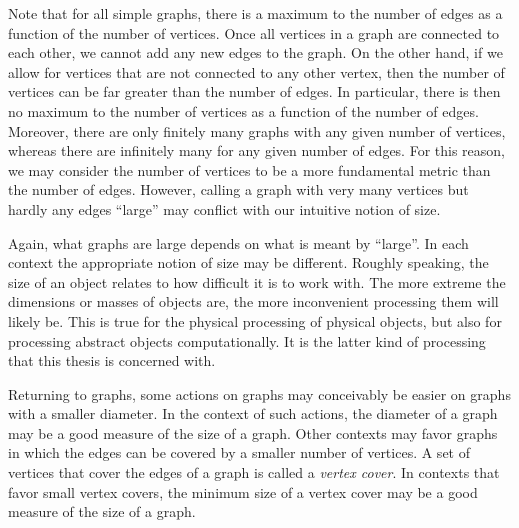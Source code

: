 Note that for all simple graphs, there is a maximum to the number of edges as a function of the number of vertices.
Once all vertices in a graph are connected to each other, we cannot add any new edges to the graph.
On the other hand, if we allow for vertices that are not connected to any other vertex, then the number of vertices can be far greater than the number of edges.
In particular, there is then no maximum to the number of vertices as a function of the number of edges.
Moreover, there are only finitely many graphs with any given number of vertices, whereas there are infinitely many for any given number of edges.
For this reason, we may consider the number of vertices to be a more fundamental metric than the number of edges.
However, calling a graph with very many vertices but hardly any edges \enquote{large} may conflict with our intuitive notion of size.

Again, what graphs are large depends on what is meant by \enquote{large}.
In each context the appropriate notion of size may be different.
Roughly speaking, the size of an object relates to how difficult it is to work with.
The more extreme the dimensions or masses of objects are, the more inconvenient processing them will likely be.
This is true for the physical processing of physical objects, but also for processing abstract objects computationally.
It is the latter kind of processing that this thesis is concerned with.

Returning to graphs, some actions on graphs may conceivably be easier on graphs with a smaller diameter.
In the context of such actions, the diameter of a graph may be a good measure of the size of a graph.
Other contexts may favor graphs in which the edges can be covered by a smaller number of vertices.
A set of vertices that cover the edges of a graph is called a \emph{vertex cover}.
In contexts that favor small vertex covers, the minimum size of a vertex cover may be a good measure of the size of a graph.

